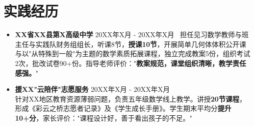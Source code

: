 	\section{\makebox[\widthof{\faGraduationCap}][c]{\color{WHU_Blue}{\faUniversity}}\quad 实践经历}
	\begin{itemize}
		\item \textbf{XX省XX县第X高级中学} \hfill 20XX年X月 - 20XX年X月 \
		担任见习数学教师与班主任与实践队财务组组长，听课8节，\textbf{授课10节}，开展简单几何体体积公开课与以"从特殊到一般"为主题的数学素质拓展课程，独立完成教案5份，组织考试2次，批改试卷90+份。指导老师评价："\textbf{教案规范，课堂组织清晰，教学责任感强。}"
		\item \textbf{援XX"云陪伴"志愿服务} \hfill 20XX年X月 - 20XX年X月 \\
		针对XX地区教育资源薄弱问题，负责五年级数学线上教学。讲授\textbf{20节课程}，形成《彩云之桥志愿者记录》及《学生成长手册》。学生期末平均分\textbf{提升10+分}，家长评价："课程设计好，善于看出孩子的不足。"
	\end{itemize}
	\vspace{-8pt}
